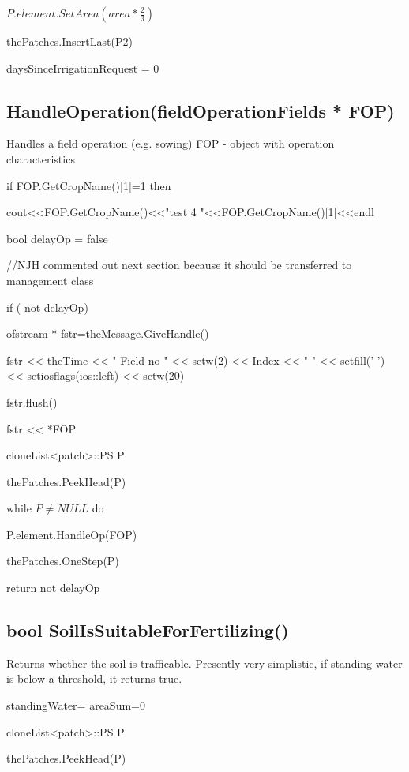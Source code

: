 \documentclass[%
]{scrartcl}
\begin{document}
{  \quad    $ P.element.SetArea(area*\tfrac{2}{3})$
  
 \quad      thePatches.InsertLast(P2)
   
   
   
   
   daysSinceIrrigationRequest = 0


\subsection{HandleOperation(fieldOperationFields * FOP)}
Handles a field operation (e.g. sowing)
   FOP -  object with operation characteristics

if FOP.GetCropName()[1]=1 then

	\quad 	cout<<FOP.GetCropName()<<"test 4 "<<FOP.GetCropName()[1]<<endl

	bool delayOp = false

   //NJH commented out next section because it should be transferred to management class

   if ( not delayOp)
   
\quad 	   ofstream * fstr=theMessage.GiveHandle()

  \quad     *fstr  << theTime  << " Field no " << setw(2) << Index  << " "  << setfill(' ') << setiosflags(ios::left)  << setw(20)
         
\quad 	   fstr.flush()
	   
  \quad 	*fstr  << *FOP


   \quad    cloneList<patch>::PS P
   
   \quad    thePatches.PeekHead(P)
   
   \quad    while $P\ne NULL$ do
      
   \quad     \quad   P.element.HandleOp(FOP)
   
    \quad     \quad  thePatches.OneStep(P)
      
	
   return  not delayOp



\subsection{bool SoilIsSuitableForFertilizing()}
Returns whether the soil is trafficable. Presently very simplistic, if standing water is below a threshold, it returns true.

   standingWater=
   areaSum=0
   
   cloneList<patch>::PS P
   
 	thePatches.PeekHead(P)
 
}
\end{document}
